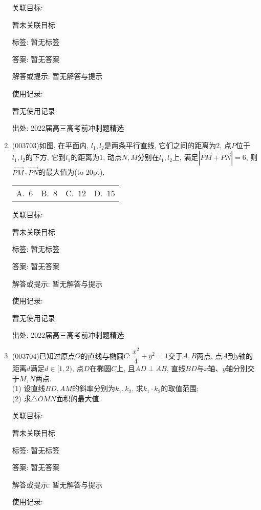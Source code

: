 \documentclass[10pt,a4paper]{article}
\newcommand{\bracket}[1]{(\hbox to #1pt{})}
\newcommand{\fourch}[4]{\par\begin{tabular}{p{.23\textwidth}p{.23\textwidth}p{.23\textwidth}p{.23\textwidth}}
A.~#1 &B.~#2& C.~#3& D.~#4
\end{tabular}}
\begin{document}
\begin{enumerate}[1.]
关联目标:

暂未关联目标



标签: 暂无标签

答案: 暂无答案

解答或提示: 暂无解答与提示

使用记录:

暂无使用记录


出处: 2022届高三高考前冲刺题精选
\item { (003703)}如图, 在平面内, $l_1,l_2$是两条平行直线, 它们之间的距离为$2$, 点$P$位于$l_1,l_2$的下方, 它到$l_1$的距离为$1$, 动点$N,M$分别在$l_1,l_2$上, 满足$|\overrightarrow{PM}+\overrightarrow{PN}|=6$, 则$\overrightarrow{PM}\cdot \overrightarrow{PN}$的最大值为\bracket{20}.
\fourch{$6$}{$8$}{$12$}{$15$}
\begin{center}
\end{center}


关联目标:

暂未关联目标



标签: 暂无标签

答案: 暂无答案

解答或提示: 暂无解答与提示

使用记录:

暂无使用记录


出处: 2022届高三高考前冲刺题精选
\item { (003704)}已知过原点$O$的直线与椭圆$C:\dfrac{x^2}4+{y^2}=1$交于$A,B$两点, 点$A$到$y$轴的距离$d$满足$d\in [1,2)$, 点$D$在椭圆$C$上, 且$AD\perp AB$, 直线$BD$与$x$轴、$y$轴分别交于$M,N$两点.\\
(1) 设直线$BD,AM$的斜率分别为$k_1,k_2$, 求$k_1\cdot k_2$的取值范围;\\
(2) 求$\triangle OMN$面积的最大值.


关联目标:

暂未关联目标



标签: 暂无标签

答案: 暂无答案

解答或提示: 暂无解答与提示

使用记录:


\end{enumerate}
\end{document}
